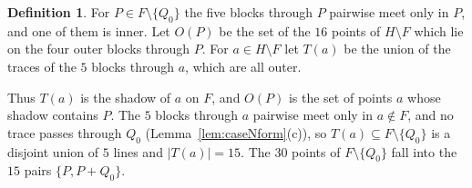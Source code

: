 \documentclass[11pt]{amsart}
\theoremstyle{definition}
\newtheorem{definition}[theorem]{Definition}
\begin{document}
\begin{definition}
For $P\in F\setminus\{Q_0\}$ the five blocks through $P$ pairwise meet only in $P$, and one of them is inner. Let $O(P)$ be the set of the $16$ points of $H\setminus F$ which lie on the four outer blocks through $P$. For $a\in H\setminus F$ let $T(a)$ be the union of the traces of the $5$ blocks through $a$, which are all outer.
\end{definition}

Thus $T(a)$ is the shadow of $a$ on $F$, and $O(P)$ is the set of points $a$ whose shadow contains $P$. The $5$ blocks through $a$ pairwise meet only in $a\notin F$, and no trace passes through $Q_0$ (Lemma~\ref{lem:caseNform}(c)), so $T(a)\subseteq F\setminus\{Q_0\}$ is a disjoint union of $5$ lines and $|T(a)|=15$. The $30$ points of $F\setminus\{Q_0\}$ fall into the $15$ pairs $\{P,P+Q_0\}$.
\end{document}
